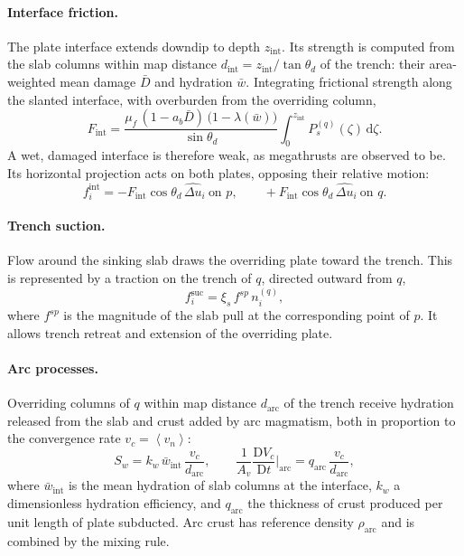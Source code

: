 \documentclass[11pt]{article}
\newcommand{\dd}{\,\mathrm{d}}
\newcommand{\mac}[1]{\left\langle #1 \right\rangle}
\begin{document}
\paragraph{Interface friction.}
The plate interface extends downdip to depth $z_{\mathrm{int}}$. Its strength is
computed from the slab columns within map distance
$d_{\mathrm{int}} = z_{\mathrm{int}}/\tan\theta_d$ of the trench: their
area-weighted mean damage $\bar D$ and hydration $\bar w$. Integrating frictional
strength along the slanted interface, with overburden from the overriding
column,
\begin{equation}
  F_{\mathrm{int}} = \frac{\mu_f\,(1-a_b\bar D)\,\big(1-\lambda(\bar w)\big)}{\sin\theta_d}
  \int_0^{z_{\mathrm{int}}} P_s^{(q)}(\zeta)\dd\zeta.
\end{equation}
A wet, damaged interface is therefore weak, as megathrusts are observed to be.
Its horizontal projection acts on both plates, opposing their relative motion:
\begin{equation}
  f^{\mathrm{int}}_i = -F_{\mathrm{int}}\cos\theta_d\,\widehat{\Delta u}_i
  \ \text{on } p,
  \qquad
  +F_{\mathrm{int}}\cos\theta_d\,\widehat{\Delta u}_i
  \ \text{on } q.
\end{equation}

\paragraph{Trench suction.}
Flow around the sinking slab draws the overriding plate toward the trench. This
is represented by a traction on the trench of $q$, directed outward from $q$,
\begin{equation}
  f^{\mathrm{suc}}_i = \xi_s\, f^{sp}\, n^{(q)}_i,
\end{equation}
where $f^{sp}$ is the magnitude of the slab pull at the corresponding point of
$p$. It allows trench retreat and extension of the overriding plate.

\paragraph{Arc processes.}
Overriding columns of $q$ within map distance $d_{\mathrm{arc}}$ of the trench
receive hydration released from the slab and crust added by arc magmatism, both
in proportion to the convergence rate $v_c = \mac{v_n}$:
\begin{equation}
  S_w = k_w\,\bar w_{\mathrm{int}}\,\frac{v_c}{d_{\mathrm{arc}}},
  \qquad
  \frac{1}{A_v}\frac{\mathrm{D}V_c}{\mathrm{D}t}\bigg|_{\mathrm{arc}}
  = q_{\mathrm{arc}}\,\frac{v_c}{d_{\mathrm{arc}}},
\end{equation}
where $\bar w_{\mathrm{int}}$ is the mean hydration of slab columns at the
interface, $k_w$ a dimensionless hydration efficiency, and $q_{\mathrm{arc}}$
the thickness of crust produced per unit length of plate subducted. Arc crust
has reference density $\rho_{\mathrm{arc}}$ and is combined by the mixing rule.
\end{document}
